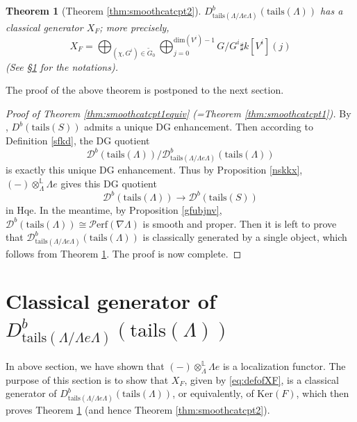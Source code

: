 \documentclass[11pt,reqno]{amsart}
\newtheorem{theorem}{Theorem}[section]
\theoremstyle{definition}
\begin{document}
\begin{theorem}[Theorem \ref{thm:smoothcatcpt2}]\label{thm:smoothcatcpt2equiv}
$D^{b}_{\mathrm{tails}(\Lambda/\Lambda e \Lambda)}(\mathrm{tails}(\Lambda))$ 
has a classical generator $X_F$; more
precisely, 
\begin{equation}
\label{eq:defofXF}
X_F = \bigoplus_{(\chi, G^i) \in \tilde{G}_0} 
\bigoplus_{j = 0}^{\mathrm{dim}(V^i) -1} G / G^i \sharp k[V^i](j)
\end{equation}
(See \S\ref{Co} for the
notations).
\end{theorem}

The proof of the above
theorem is
postponed to the next section. 


\begin{proof}[Proof of Theorem \ref{thm:smoothcatcpt1equiv}
(=Theorem \ref{thm:smoothcatcpt1})]
By \cite[Theorem A]{CNS}, $D^{b}(\mathrm{tails}(S))$ admits a 
unique DG enhancement. Then according to
Definition \ref{sfkd}, the DG quotient 
$$\mathcal{D}^{b}(\mathrm{tails}
(\Lambda)) / \mathcal{D}^{b}_{\mathrm{tails}
(\Lambda /\Lambda e \Lambda)}(\mathrm{tails}(\Lambda))$$ is 
exactly this unique DG enhancement. 
Thus by Proposition \ref{nskkx},  
$(-) \otimes^{\mathbb{L}}_{\Lambda} \Lambda e$
gives this DG quotient  
$$
\mathcal{D}^{b}(\mathrm{tails}(\Lambda)) \rightarrow \mathcal{D}^{b}(\mathrm{tails}(S)) 
$$
in $\mathrm{Hqe}$. In the meantime, 
by Proposition \ref{gfubjnv}, 
$\mathcal{D}^{b}(\mathrm{tails}(\Lambda)) 
\cong \mathcal{P}\mathrm{erf}(\nabla \Lambda)$ is smooth and proper. 
Then it is left to prove that 
$\mathcal{D}^{b}_{\mathrm{tails}(\Lambda /\Lambda e \Lambda)}
(\mathrm{tails}(\Lambda))$ is classically generated by a single object,
which follows from 
Theorem \ref{thm:smoothcatcpt2equiv}. 
The proof is now complete.
\end{proof}


\section{Classical generator of $D^{b}_{\mathrm{tails}
(\Lambda/\Lambda e \Lambda)}(\mathrm{tails}(\Lambda))$}\label{Co}

In above section, we have shown that
$(-) \otimes^{\mathbb{L}}_{\Lambda} \Lambda e$ is a localization functor.
The purpose of this section is to
show that $X_F$,
given by \eqref{eq:defofXF}, is a classical generator of 
$D^{b}_{\mathrm{tails}(\Lambda/\Lambda e \Lambda)}(\mathrm{tails}(\Lambda))$, 
or equivalently, of $\mathrm{Ker}(F)$,
which then proves Theorem 
\ref{thm:smoothcatcpt2equiv}
(and hence Theorem
\ref{thm:smoothcatcpt2}).
\end{document}
